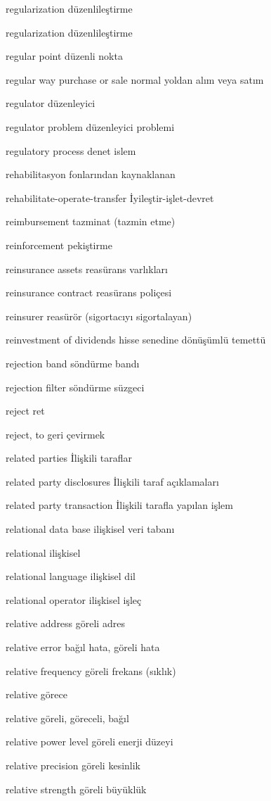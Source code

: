 \documentclass[12pt,fleqn]{article}\usepackage{../../common}
\begin{document}
regularization düzenlileştirme

regularization düzenlileştirme

regular point düzenli nokta

regular way purchase or sale normal yoldan alım veya satım

regulator düzenleyici

regulator problem düzenleyici problemi

regulatory process denet islem

rehabilitasyon fonlarından kaynaklanan

rehabilitate-operate-transfer İyileştir-işlet-devret

reimbursement tazminat (tazmin etme)

reinforcement pekiştirme

reinsurance assets reasürans varlıkları

reinsurance contract reasürans poliçesi

reinsurer reasürör (sigortacıyı sigortalayan)

reinvestment of dividends hisse senedine dönüşümlü temettü

rejection band söndürme bandı

rejection filter söndürme süzgeci

reject ret

reject, to geri çevirmek

related parties İlişkili taraflar

related party disclosures İlişkili taraf açıklamaları

related party transaction İlişkili tarafla yapılan işlem

relational data base ilişkisel veri tabanı

relational ilişkisel

relational language ilişkisel dil

relational operator ilişkisel işleç

relative address göreli adres

relative error bağıl hata, göreli hata

relative frequency göreli frekans (sıklık)

relative görece

relative göreli, göreceli, bağıl

relative power level göreli enerji düzeyi

relative precision göreli kesinlik

relative strength göreli büyüklük
\end{document}
